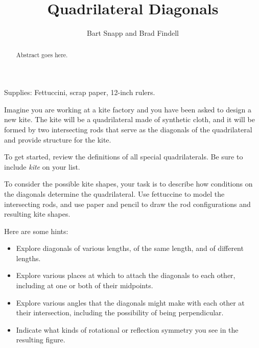 \documentclass{ximera}
\title{Quadrilateral Diagonals}
\author{Bart Snapp and Brad Findell}
\begin{document}
\begin{abstract}
Abstract goes here.  
\end{abstract}
\maketitle

\begin{teachingnote}
Supplies:  Fettuccini, scrap paper, 12-inch rulers.
\end{teachingnote}

Imagine you are working at a kite factory and you have been asked to design a new kite.  The kite will be a quadrilateral made of synthetic cloth, and it will be formed by two intersecting rods that serve as the diagonals of the quadrilateral and provide structure for the kite.  

\begin{problem}
To get started, review the definitions of all special quadrilaterals.  Be sure to include \emph{kite} on your list.  
\end{problem}

\begin{problem}
To consider the possible kite shapes, your task is to describe how conditions on the diagonals determine the quadrilateral.  Use fettuccine to model the intersecting rods, and use paper and pencil to draw the rod configurations and resulting kite shapes.  

Here are some hints:  

\begin{itemize}
\item Explore diagonals of various lengths, of the same length, and of different lengths.  
\item Explore various places at which to attach the diagonals to each other, including at one or both of their midpoints.  
\item Explore various angles that the diagonals might make with each other at their intersection, including the possibility of being perpendicular.  
\item Indicate what kinds of rotational or reflection symmetry you see in the resulting figure.
\end{itemize}
\end{problem}
\end{document}
